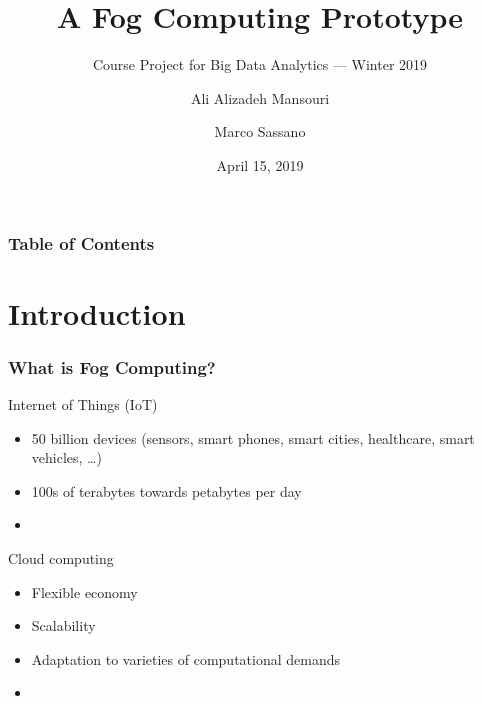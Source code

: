 \documentclass[xelatex,usenames,dvipsnames]{beamer}
\title[Crisis] %
{A Fog Computing Prototype}
\subtitle{Course Project for Big Data Analytics --- Winter 2019}
\author[Ali, Marco] %
{Ali Alizadeh Mansouri \and Marco Sassano}
\institute[Concordia University] %
{
    Concordia University\\
}
\date[April 15, 2019] %
{April 15, 2019}
\begin{document}
\frame{\titlepage}


\begin{frame}
    \frametitle{Table of Contents}
    \tableofcontents[currentsection]
\end{frame}




\section[Introduction]{Introduction}



  \begin{frame}
    \frametitle{What is Fog Computing?}
    \alert{Internet of Things (IoT)}
    
    \begin{itemize}
      \item 50 billion devices (sensors, smart phones, smart cities, healthcare, smart vehicles, \ldots) %
      \item 100s of terabytes towards petabytes per day 
      \item {\color{RedOrange}{limited computing resources}}
    \end{itemize} 

    \pause

    \alert{Cloud computing}
    \begin{itemize}
      \item Flexible economy
      \item Scalability
      \item Adaptation to varieties of computational demands
      \item {\color{RedOrange}{Suffers from high latency}}
    \end{itemize}
  \end{frame}
\end{document}
